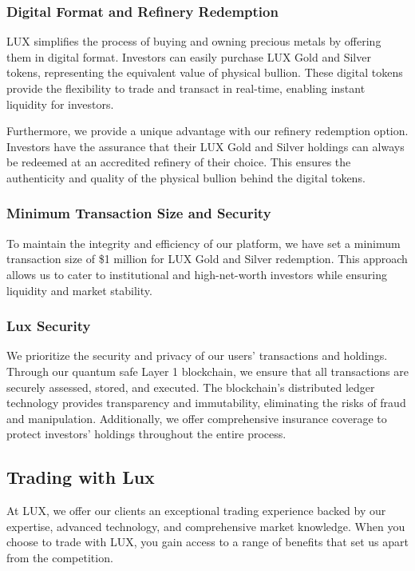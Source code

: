 \documentclass[11pt]{article}
\begin{document}
\subsubsection{Digital Format and Refinery Redemption}

LUX simplifies the process of buying and owning precious metals by offering them in digital format. Investors can easily purchase LUX Gold and Silver tokens, representing the equivalent value of physical bullion. These digital tokens provide the flexibility to trade and transact in real-time, enabling instant liquidity for investors.


Furthermore, we provide a unique advantage with our refinery redemption option. Investors have the assurance that their LUX Gold and Silver holdings can always be redeemed at an accredited refinery of their choice. This ensures the authenticity and quality of the physical bullion behind the digital tokens.


\subsubsection{Minimum Transaction Size and Security}

To maintain the integrity and efficiency of our platform, we have set a minimum transaction size of \$1 million for LUX Gold and Silver redemption. This approach allows us to cater to institutional and high-net-worth investors while ensuring liquidity and market stability.


\subsubsection{Lux Security}

We prioritize the security and privacy of our users' transactions and holdings. Through our quantum safe Layer 1 blockchain, we ensure that all transactions are securely assessed, stored, and executed. The blockchain's distributed ledger technology provides transparency and immutability, eliminating the risks of fraud and manipulation. Additionally, we offer comprehensive insurance coverage to protect investors' holdings throughout the entire process.


\subsection{Trading with Lux}

At LUX, we offer our clients an exceptional trading experience backed by our expertise, advanced technology, and comprehensive market knowledge. When you choose to trade with LUX, you gain access to a range of benefits that set us apart from the competition.
\end{document}

